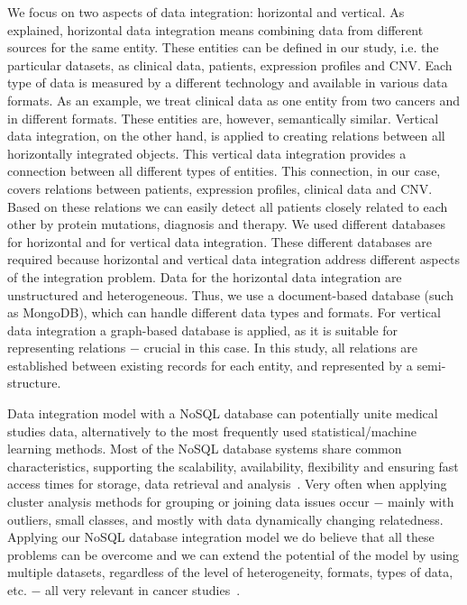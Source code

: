 \documentclass{bmcart}
\begin{document}
We focus on two aspects of data integration: horizontal and vertical. As
explained, horizontal data integration means combining data from
different sources for the same entity. These entities can be defined in
our study, i.e. the particular datasets, as clinical data, patients,
expression profiles and CNV. Each type of data is measured by a
different technology and available in various data formats. As an
example, we treat clinical data as one entity from two cancers and in
different formats. These entities are, however, semantically similar.
Vertical data integration, on the other hand, is applied to creating
relations between all horizontally integrated objects. This vertical
data integration provides a connection between all different types of
entities. This connection, in our case, covers relations between
patients, expression profiles, clinical data and CNV. Based on these
relations we can easily detect all patients closely related to each
other by protein mutations, diagnosis and therapy. We used different
databases for horizontal and for vertical data integration. These
different databases are required because horizontal and vertical data
integration address different aspects of the integration problem. Data
for the horizontal data integration are unstructured and heterogeneous.
Thus, we use a document-based database (such as MongoDB), which can
handle different data types and formats. For vertical data integration
a graph-based database is applied, as it is suitable for representing
relations $-$ crucial in this case. In this study, all relations are
established between existing records for each entity, and represented
by a semi-structure.

Data integration model with a NoSQL database can potentially unite
medical studies data, alternatively to the most frequently used
statistical/machine learning methods. Most of the NoSQL database
systems share common characteristics, supporting the scalability,
availability, flexibility and ensuring fast access times for storage,
data retrieval and analysis~\cite{21, 22}. Very often when applying cluster
analysis methods for grouping or joining data issues occur $-$ mainly
with outliers, small classes, and mostly with data dynamically changing
relatedness. Applying our NoSQL database integration model we do
believe that all these problems can be overcome and we can extend the
potential of the model by using multiple datasets, regardless of the
level of heterogeneity, formats, types of data, etc. $-$ all very
relevant in cancer studies~\cite{14}.
\end{document}
